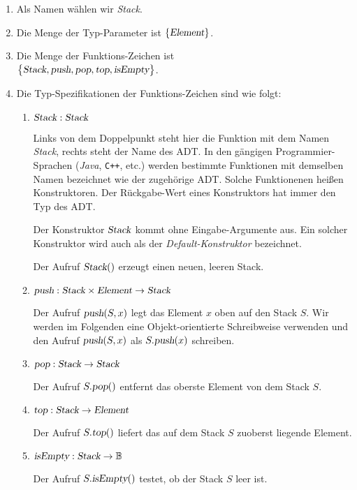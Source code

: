 \begin{enumerate}
\item Als Namen w\"ahlen wir \textsl{Stack}.
\item Die Menge der Typ-Parameter ist $\{ \textsl{Element} \}$.
\item Die Menge der Funktions-Zeichen ist \\[0.1cm]
      \hspace*{1.3cm} 
      $\bigl\{ \textsl{Stack}, \textsl{push}, \textsl{pop}, \textsl{top}, \textsl{isEmpty} \bigr\}$.
\item Die Typ-Spezifikationen der Funktions-Zeichen sind wie folgt:
      \begin{enumerate}
      \item $\textsl{Stack}: \textsl{Stack}$

            Links von dem Doppelpunkt steht hier die Funktion mit dem Namen
            \textsl{Stack}, rechts steht der Name des ADT.  In den g\"angigen
            Programmier-Sprachen (\textsl{Java}, \texttt{C++}, etc.) 
            werden bestimmte Funktionen mit demselben Namen bezeichnet wie der zugeh\"orige
            ADT.  Solche Funktionenen hei{\ss}en Konstruktoren.  Der R\"uckgabe-Wert eines
            Konstruktors hat immer den Typ des ADT.

            Der Konstruktor $\textsl{Stack}$ kommt ohne Eingabe-Argumente aus.  Ein
            solcher Konstruktor wird auch als der \emph{Default-Konstruktor} bezeichnet.
            
            Der Aufruf $\textsl{Stack}()$ erzeugt einen neuen, leeren Stack.
      \item $\textsl{push}: \textsl{Stack} \times \textsl{Element} \rightarrow \textsl{Stack}$

            Der Aufruf $\textsl{push}(S,x)$ legt das Element $x$ oben auf den Stack $S$.
            Wir werden im Folgenden eine Objekt-orientierte Schreibweise verwenden und
            den Aufruf  $\textsl{push}(S,x)$ als $S.\textsl{push}(x)$ schreiben.
      \item $\textsl{pop}: \textsl{Stack}  \rightarrow \textsl{Stack}$

            Der Aufruf $S.\textsl{pop}()$ entfernt das oberste Element von dem Stack $S$.
      \item $\textsl{top}: \textsl{Stack} \rightarrow \textsl{Element}$

            Der Aufruf $S.\textsl{top}()$ liefert das auf dem Stack $S$ zuoberst liegende Element. 
      \item $\textsl{isEmpty}: \textsl{Stack} \rightarrow \mathbb{B}$

            Der Aufruf $S.\textsl{isEmpty}()$ testet, ob der Stack $S$ leer ist.
      \end{enumerate}
\end{enumerate}
